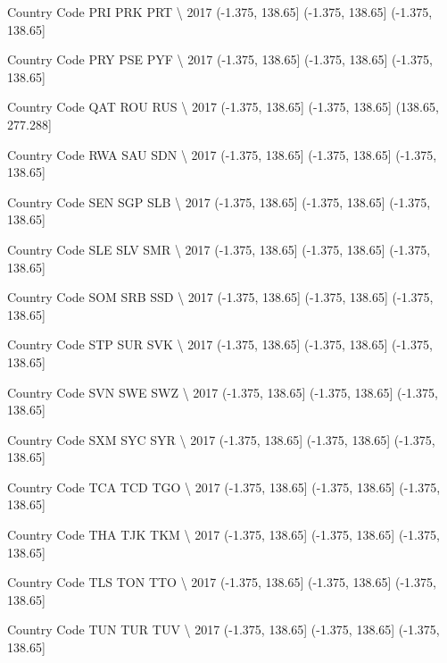 \documentclass[11pt]{article}
\begin{document}
Country Code               PRI               PRK               PRT  \textbackslash{}
2017          (-1.375, 138.65]  (-1.375, 138.65]  (-1.375, 138.65]   

Country Code               PRY               PSE               PYF  \textbackslash{}
2017          (-1.375, 138.65]  (-1.375, 138.65]  (-1.375, 138.65]   

Country Code               QAT               ROU                RUS  \textbackslash{}
2017          (-1.375, 138.65]  (-1.375, 138.65]  (138.65, 277.288]   

Country Code               RWA               SAU               SDN  \textbackslash{}
2017          (-1.375, 138.65]  (-1.375, 138.65]  (-1.375, 138.65]   

Country Code               SEN               SGP               SLB  \textbackslash{}
2017          (-1.375, 138.65]  (-1.375, 138.65]  (-1.375, 138.65]   

Country Code               SLE               SLV               SMR  \textbackslash{}
2017          (-1.375, 138.65]  (-1.375, 138.65]  (-1.375, 138.65]   

Country Code               SOM               SRB               SSD  \textbackslash{}
2017          (-1.375, 138.65]  (-1.375, 138.65]  (-1.375, 138.65]   

Country Code               STP               SUR               SVK  \textbackslash{}
2017          (-1.375, 138.65]  (-1.375, 138.65]  (-1.375, 138.65]   

Country Code               SVN               SWE               SWZ  \textbackslash{}
2017          (-1.375, 138.65]  (-1.375, 138.65]  (-1.375, 138.65]   

Country Code               SXM               SYC               SYR  \textbackslash{}
2017          (-1.375, 138.65]  (-1.375, 138.65]  (-1.375, 138.65]   

Country Code               TCA               TCD               TGO  \textbackslash{}
2017          (-1.375, 138.65]  (-1.375, 138.65]  (-1.375, 138.65]   

Country Code               THA               TJK               TKM  \textbackslash{}
2017          (-1.375, 138.65]  (-1.375, 138.65]  (-1.375, 138.65]   

Country Code               TLS               TON               TTO  \textbackslash{}
2017          (-1.375, 138.65]  (-1.375, 138.65]  (-1.375, 138.65]   

Country Code               TUN               TUR               TUV  \textbackslash{}
2017          (-1.375, 138.65]  (-1.375, 138.65]  (-1.375, 138.65]   
\end{document}
